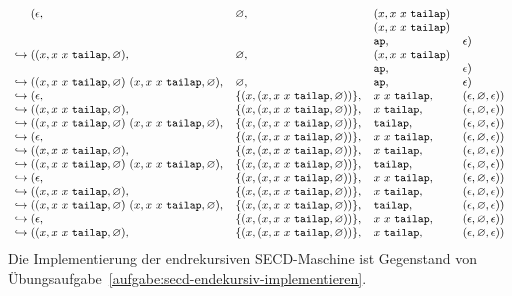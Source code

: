 \begin{displaymath}\small
  \begin{array}{l@{}llll}
 &(\epsilon, &\varnothing, &(x, x~x~\mathtt{tailap})\\ &&&(x, x~x~\mathtt{tailap})\\ &&&\mathtt{ap}, &\epsilon)\\
\hookrightarrow{}&((x, x~x~\mathtt{tailap}, \varnothing), &\varnothing, &(x, x~x~\mathtt{tailap})\\ &&&\mathtt{ap}, &\epsilon)\\
\hookrightarrow{}&((x, x~x~\mathtt{tailap}, \varnothing)~(x, x~x~\mathtt{tailap}, \varnothing), &\varnothing, &\mathtt{ap}, &\epsilon)\\
\hookrightarrow{}&(\epsilon, &\{(x, (x, x~x~\mathtt{tailap}, \varnothing))\}, &x~x~\mathtt{tailap}, &(\epsilon, \varnothing, \epsilon))\\
\hookrightarrow{}&((x, x~x~\mathtt{tailap}, \varnothing), &\{(x, (x, x~x~\mathtt{tailap}, \varnothing))\}, &x~\mathtt{tailap}, &(\epsilon, \varnothing, \epsilon))\\
\hookrightarrow{}&((x, x~x~\mathtt{tailap}, \varnothing)~(x, x~x~\mathtt{tailap}, \varnothing), &\{(x, (x, x~x~\mathtt{tailap}, \varnothing))\}, &\mathtt{tailap}, &(\epsilon, \varnothing, \epsilon))\\
\hookrightarrow{}&(\epsilon, &\{(x, (x, x~x~\mathtt{tailap}, \varnothing))\}, &x~x~\mathtt{tailap}, &(\epsilon, \varnothing, \epsilon))\\
\hookrightarrow{}&((x, x~x~\mathtt{tailap}, \varnothing), &\{(x, (x, x~x~\mathtt{tailap}, \varnothing))\}, &x~\mathtt{tailap}, &(\epsilon, \varnothing, \epsilon))\\
\hookrightarrow{}&((x, x~x~\mathtt{tailap}, \varnothing)~(x, x~x~\mathtt{tailap}, \varnothing), &\{(x, (x, x~x~\mathtt{tailap}, \varnothing))\}, &\mathtt{tailap}, &(\epsilon, \varnothing, \epsilon))\\
\hookrightarrow{}&(\epsilon, &\{(x, (x, x~x~\mathtt{tailap}, \varnothing))\}, &x~x~\mathtt{tailap}, &(\epsilon, \varnothing, \epsilon))\\
\hookrightarrow{}&((x, x~x~\mathtt{tailap}, \varnothing), &\{(x, (x, x~x~\mathtt{tailap}, \varnothing))\}, &x~\mathtt{tailap}, &(\epsilon, \varnothing, \epsilon))\\
\hookrightarrow{}&((x, x~x~\mathtt{tailap}, \varnothing)~(x, x~x~\mathtt{tailap}, \varnothing), &\{(x, (x, x~x~\mathtt{tailap}, \varnothing))\}, &\mathtt{tailap}, &(\epsilon, \varnothing, \epsilon))\\
\hookrightarrow{}&(\epsilon, &\{(x, (x, x~x~\mathtt{tailap}, \varnothing))\}, &x~x~\mathtt{tailap}, &(\epsilon, \varnothing, \epsilon))\\
\hookrightarrow{}&((x, x~x~\mathtt{tailap}, \varnothing), &\{(x, (x, x~x~\mathtt{tailap}, \varnothing))\}, &x~\mathtt{tailap}, &(\epsilon, \varnothing, \epsilon))
 \end{array}
\end{displaymath}
Die Implementierung der endrekursiven SECD-Maschine ist Gegenstand von
Übungsaufgabe~\ref{aufgabe:secd-endekursiv-implementieren}.

